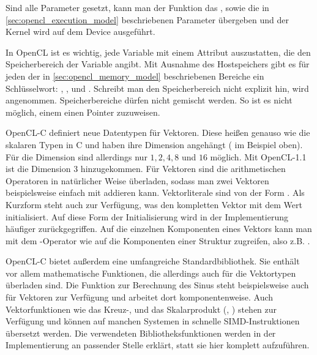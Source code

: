 Sind alle Parameter gesetzt, kann man der Funktion
 das , sowie die
in \autoref{sec:opencl_execution_model} beschriebenen Parameter
übergeben und der Kernel wird auf dem Device ausgeführt.

In OpenCL ist es wichtig, jede Variable mit einem Attribut
auszustatten, die den Speicherbereich der Variable angibt. Mit
Ausnahme des Hostspeichers gibt es für jeden der in
\autoref{sec:opencl_memory_model} beschriebenen Bereiche ein
Schlüsselwort: ,
,  und
. Schreibt man den Speicherbereich nicht
explizit hin, wird 
angenommen. Speicherbereiche dürfen nicht gemischt werden. So ist es
nicht möglich, einem  einen Pointer
 zuzuweisen.

OpenCL-C definiert neue Datentypen für Vektoren. Diese heißen genauso
wie die skalaren Typen in C und haben ihre Dimension angehängt
(\PimiddyzB {} im Beispiel oben). Für die
Dimension sind allerdings nur $1,2,4,8$ und $16$ möglich. Mit
OpenCL-1.1 ist die Dimension $3$ hinzugekommen. Für Vektoren sind die
arithmetischen Operatoren in natürlicher Weise überladen, sodass man
zwei Vektoren beispielsweise einfach mit 
addieren kann. Vektorliterale sind von der Form
. Als Kurzform steht auch
 zur Verfügung, was den kompletten Vektor
mit dem Wert  initialisiert. Auf diese Form der
Initialisierung wird in der Implementierung häufiger
zurückgegriffen. Auf die einzelnen Komponenten eines Vektors kann man
mit dem -Operator wie auf die Komponenten einer
Struktur zugreifen, also z.B. .

OpenCL-C bietet außerdem eine umfangreiche Standardbibliothek. Sie
enthält vor allem mathematische Funktionen, die allerdings auch für
die Vektortypen überladen sind. Die Funktion 
zur Berechnung des Sinus steht beispielsweise auch für Vektoren zur
Verfügung und arbeitet dort komponentenweise. Auch
 Vektorfunktionen wie das Kreuz-, und das
Skalarprodukt (, )
stehen zur Verfügung und können auf manchen Systemen in schnelle
SIMD-Instruktionen übersetzt werden. Die verwendeten
Bibliotheksfunktionen werden in der Implementierung an passender
Stelle erklärt, statt sie hier komplett aufzuführen.

